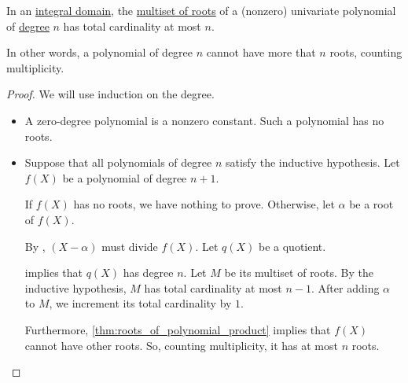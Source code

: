 \begin{proposition}\label{thm:polynomial_degree_bounds_root_count}
  In an \hyperref[def:integral_domain]{integral domain}, the \hyperref[def:polynomial_root_multiplicity]{multiset of roots} of a (nonzero) univariate polynomial of \hyperref[def:polynomial_degree]{degree} \( n \) has total cardinality at most \( n \).
\end{proposition}
\begin{comments}
  \item In other words, a polynomial of degree \( n \) cannot have more that \( n \) roots, counting multiplicity.
\end{comments}
\begin{proof}
  We will use induction on the degree.
  \begin{itemize}
    \item A zero-degree polynomial is a nonzero constant. Such a polynomial has no roots.

    \item Suppose that all polynomials of degree \( n \) satisfy the inductive hypothesis. Let \( f(X) \) be a polynomial of degree \( n + 1 \).

    If \( f(X) \) has no roots, we have nothing to prove. Otherwise, let \( \alpha \) be a root of \( f(X) \).

    By , \( (X - \alpha) \) must divide \( f(X) \). Let \( q(X) \) be a quotient.

     implies that \( q(X) \) has degree \( n \). Let \( M \) be its multiset of roots. By the inductive hypothesis, \( M \) has total cardinality at most \( n - 1 \). After adding \( \alpha \) to \( M \), we increment its total cardinality by \( 1 \).

    Furthermore, \cref{thm:roots_of_polynomial_product} implies that \( f(X) \) cannot have other roots. So, counting multiplicity, it has at most \( n \) roots.
  \end{itemize}
\end{proof}

